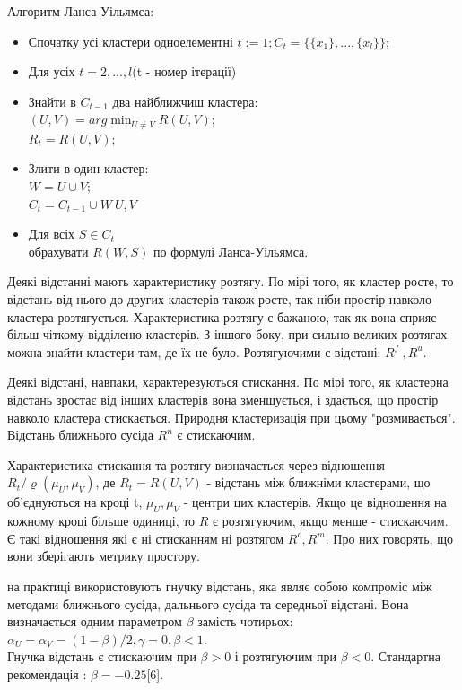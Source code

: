 \documentclass[a4paper,14pt,russian]{extreport}
\begin{document}
\par 
Алгоритм Ланса-Уільямса:  \\
\begin{itemize}

\item Спочатку усі кластери одноелементні  $ t:=1;  C_t = \big\{ \{ x_1 \} ,..., \{ x_l \} \big\}; $ 
\item Для усіх $t = 2, ..., l$(t - номер ітерації)
\item Знайти в  $C_{t-1}$ два найближчиш кластера: \\ $(U,V) = arg \min_{U \ne V}R(U,V);$\\
$R_t = R(U,V);$

\item Злити в один кластер: \\
$W = U \cup V;$\\
$ C_t = C_{t-1} \cup {W} \ {U,V}$
\item Для всіх $S \in C_t$ \\ обрахувати $R(W,S)$ по формулі Ланса-Уільямса.
\end{itemize}
\par 
	Деякі відстанні мають характеристику розтягу. По мірі того, як кластер росте, то відстань від нього до других кластерів також росте, так ніби простір навколо кластера розтягується. Характеристика розтягу є бажаною, так як вона сприяє більш чіткому відділеню кластерів. З іншого боку, при сильно великих розтягах можна знайти кластери там, де їх не було. Розтягуючими є відстані: $R^f \ , R^u$.\par 
	
	Деякі відстані, навпаки,  характерезуються стискання. По мірі того, як кластерна відстань зростає від інших кластерів вона зменшується, і здається, що простір навколо кластера стискається. Природня кластеризація при цьому "розмивається". Відстань ближнього сусіда $R^n$ є стискаючим. \par 
	Характеристика стискання та розтягу визначається через відношення $R_t/ \varrho(\mu_U, \mu_V)$, де $R_t = R(U,V)$ - відстань між ближніми кластерами, що об'єднуються на кроці t, $\mu_U, \mu_V$ - центри цих кластерів. Якщо це відношення на кожному кроці більше одиниці, то $R$ є розтягуючим, якщо менше - стискаючим. Є такі відношення які є ні стисканням ні розтягом $R^c, R^m$. Про них говорять, що вони зберігають метрику простору.\par 
	на практиці використовують гнучку відстань, яка являє собою компроміс між методами ближнього сусіда, дальнього сусіда та середньої відстані. Вона визначається одним параметром  $\beta$ замість чотирьох: \\
	$\alpha_U = \alpha_V = (1-\beta)/2, \gamma = 0, \beta < 1$.
	\\
	Гнучка відстань є стискаючим при $\beta > 0$ і  розтягуючим при $\beta < 0$. Стандартна рекомендація :  $\beta = -0.25$[6].
\end{document}
